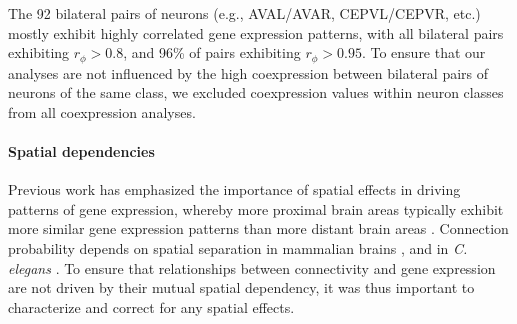 \documentclass[10pt,letterpaper]{article}
\begin{document}
The 92 bilateral pairs of neurons (e.g., AVAL/AVAR, CEPVL/CEPVR, etc.) mostly exhibit highly correlated gene expression patterns, with all bilateral pairs exhibiting $r_\phi > 0.8$, and 96\% of pairs exhibiting $r_\phi > 0.95$.
To ensure that our analyses are not influenced by the high coexpression between bilateral pairs of neurons of the same class, we excluded coexpression values within neuron classes from all coexpression analyses.

\paragraph{Spatial dependencies}
Previous work has emphasized the importance of spatial effects in driving patterns of gene expression, whereby more proximal brain areas typically exhibit more similar gene expression patterns than more distant brain areas \cite{Krienen2016, Fulcher:2016ck, Pantazatos:2016ir, Richiardi:2017hb}.
Connection probability depends on spatial separation in mammalian brains \cite{Henderson:2014fg, Horvat:2016ia, Wang:2016gg, Markov:2013jo}, and in \emph{C. elegans} \cite{Azulay:2016cg}.
To ensure that relationships between connectivity and gene expression are not driven by their mutual spatial dependency, it was thus important to characterize and correct for any spatial effects.
\end{document}
